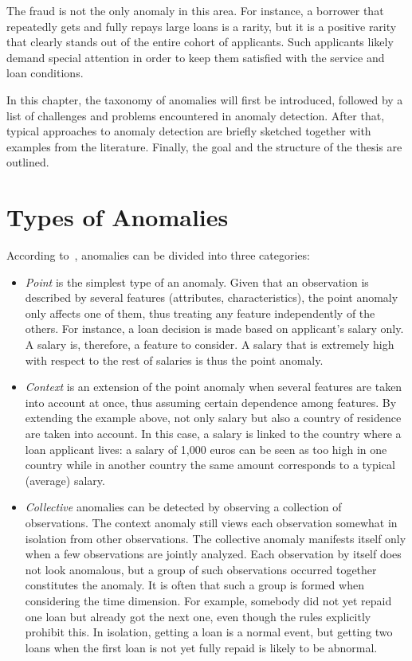 The fraud is not the only anomaly in this area. For instance, a borrower that repeatedly gets and fully repays large loans is a rarity, but it is a positive rarity that clearly stands out of the entire cohort of applicants. Such applicants likely demand special attention in order to keep them satisfied with the service and loan conditions.

In this chapter, the taxonomy of anomalies will first be introduced, followed by a list of challenges and problems encountered in anomaly detection. After that, typical approaches to anomaly detection are briefly sketched together with examples from the literature. Finally, the goal and the structure of the thesis are outlined.

\section{Types of Anomalies}\label{taxonomyofanomalies}
According to~\cite{Chandola:2009:ADS:1541880.1541882}, anomalies can be divided into three categories:
\begin{itemize}
    \item \textit{Point} is the simplest type of an anomaly. Given that an observation is described by several features (attributes, characteristics), the point anomaly only affects one of them, thus treating any feature independently of the others. For instance, a loan decision is made based on applicant's salary only. A salary is, therefore, a feature to consider. A salary that is extremely high with respect to the rest of salaries is thus the point anomaly.

    \item \textit{Context} is an extension of the point anomaly when several features are taken into account at once, thus assuming certain dependence among features. By extending the example above, not only salary but also a country of residence are taken into account. In this case, a salary is linked to the country where a loan applicant lives: a salary of 1,000 euros can be seen as too high in one country while in another country the same amount corresponds to a typical (average) salary.

    \item \textit{Collective} anomalies can be detected by observing a collection of observations. The context anomaly still views each observation somewhat in isolation from other observations. The collective anomaly manifests itself only when a few observations are jointly analyzed. Each observation by itself does not look anomalous, but a group of such observations occurred together constitutes the anomaly. It is often that such a group is formed when considering the time dimension. For example, somebody did not yet repaid one loan but already got the next one, even though the rules explicitly prohibit this. In isolation, getting a loan is a normal event, but getting two loans when the first loan is not yet fully repaid is likely to be abnormal.
\end{itemize}

